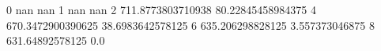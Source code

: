 0 nan nan
1 nan nan
2 711.8773803710938 80.22845458984375
4 670.3472900390625 38.6983642578125
6 635.206298828125 3.557373046875
8 631.64892578125 0.0
